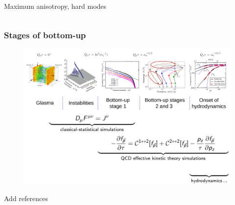 \documentclass[aspectratio=169,11pt,usenames,dvipsnames]{beamer}
\begin{document}
\begin{frame}
\begin{columns}[onlytextwidth,t]
\begin{center}
\begin{itemize}
{                Maximum anisotropy, hard modes}
            \end{itemize}
        \end{center}
    \end{columns}
\end{frame}

\begin{frame}[noframenumbering]
    \frametitle{Stages of bottom-up}
    \begin{center}
       \begin{figure}
            \includegraphics[width=1.4\textheight]{images/Screenshot from 2024-08-23 16-32-50.png}
        \end{figure}
        {\color{red}Add references}
    \end{center}
\end{frame}
\end{document}
